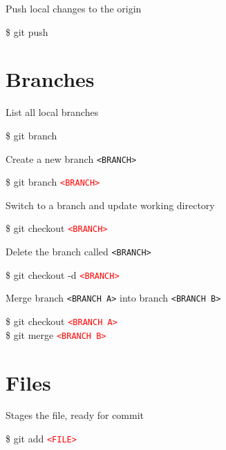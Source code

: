 \documentclass[10pt,a4paper]{article}
\newenvironment{cheatentry}{%
    \noindent%
    \begin{minipage}{\columnwidth}%
    \small%
    \noindent%
}{%
    \end{minipage}%
}
\newcommand{\entrysep}{\vspace{1em}}
\newcommand{\cheatcmd}[1]{%
    \noindent\begin{cmdbox}{\large\ttfamily\fontseries{b}\selectfont #1}\end{cmdbox}
}
\newcommand{\cheatmetavar}[1]{%
    \textcolor{red}{\texttt{\textless{}#1\textgreater{}}}%
}
\newcommand{\cheatmetavarref}[1]{%
    {\texttt{\textless{}#1\textgreater{}}}%
}
\begin{document}
\begin{multicols}{4}
\begin{cheatentry}%
Push local changes to the origin
\cheatcmd{\$ git push}
\end{cheatentry}

\section{Branches}

\begin{cheatentry}%
List all local branches
\cheatcmd{\$ git branch}
\end{cheatentry}%

\entrysep{}%

\begin{cheatentry}%
Create a new branch \cheatmetavarref{BRANCH}
\cheatcmd{\$ git branch \cheatmetavar{BRANCH}}
\end{cheatentry}%

\entrysep{}%

\begin{cheatentry}%
Switch to a branch and update working directory
\cheatcmd{\$ git checkout \cheatmetavar{BRANCH}}
\end{cheatentry}

\entrysep{}%

\begin{cheatentry}%
Delete the branch called \cheatmetavarref{BRANCH}
\cheatcmd{\$ git checkout -d \cheatmetavar{BRANCH}}
\end{cheatentry}

\entrysep{}%

\begin{cheatentry}%
Merge branch \cheatmetavarref{BRANCH~A} into branch \cheatmetavarref{BRANCH~B}
\cheatcmd{\$ git checkout \cheatmetavar{BRANCH~A}\\\$ git merge \cheatmetavar{BRANCH~B}}
\end{cheatentry}

\section{Files}

\begin{cheatentry}%
Stages the file, ready for commit
\cheatcmd{\$ git add \cheatmetavar{FILE}}
\end{cheatentry}

\entrysep{}%


\end{multicols}
\end{document}
